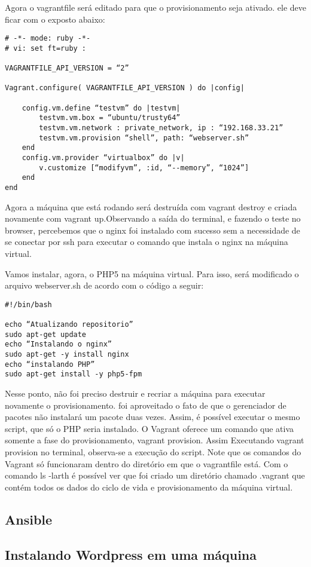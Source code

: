 Agora o vagrantfile será editado para que o provisionamento 
seja ativado. ele deve ficar com o exposto abaixo:
\begin{lstlisting}
# -*- mode: ruby -*-
# vi: set ft=ruby :

VAGRANTFILE_API_VERSION = “2”

Vagrant.configure( VAGRANTFILE_API_VERSION ) do |config|

	config.vm.define “testvm” do |testvm|
		testvm.vm.box = “ubuntu/trusty64”
		testvm.vm.network : private_network, ip : “192.168.33.21”
		testvm.vm.provision “shell”, path: “webserver.sh”
	end
	config.vm.provider “virtualbox” do |v|
		v.customize [“modifyvm”, :id, “--memory”, “1024”]
	end
end
\end{lstlisting}

Agora a máquina que está rodando será 
destruída com vagrant destroy e criada novamente com 
vagrant up.Observando a saída do terminal, e fazendo 
o teste no browser, percebemos que o nginx foi 
instalado com sucesso sem a necessidade de se conectar 
por ssh para executar o comando que instala o nginx na 
máquina virtual.

Vamos instalar, agora, o PHP5 na máquina virtual. Para isso, 
será modificado o arquivo webserver.sh de acordo com o código
a seguir:
\begin{lstlisting}
#!/bin/bash

echo “Atualizando repositorio”
sudo apt-get update
echo “Instalando o nginx”
sudo apt-get -y install nginx
echo “instalando PHP”
sudo apt-get install -y php5-fpm
\end{lstlisting}
Nesse ponto, não foi preciso destruir e recriar a máquina para 
executar novamente o provisionamento. foi aproveitado o fato 
de que o gerenciador de pacotes não instalará um pacote duas 
vezes. Assim, é possível executar o mesmo script, que só o PHP 
seria instalado. O Vagrant oferece um comando que ativa somente 
a fase do provisionamento, vagrant provision. Assim Executando 
vagrant provision no terminal, observa-se a execução do script. 
Note que os comandos do Vagrant só funcionaram dentro 
do diretório em que o vagrantfile está. 
Com o comando ls -larth é possível ver que foi criado um diretório 
chamado .vagrant que contém todos os dados do ciclo de vida e 
provisionamento da máquina virtual.

\subsection{Ansible}
\subsection{Instalando Wordpress em uma máquina}

